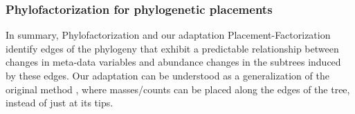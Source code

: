 
\subsubsection*{Phylofactorization for phylogenetic placements}
\label{sec:Factorization:sub:PhyloFactorization:sub:PhylofactorPlacements}

In summary, Phylofactorization and our adaptation Placement-Factorization
identify edges of the phylogeny that exhibit a predictable relationship between changes in meta-data variables and
abundance changes in the subtrees induced by these edges.
Our adaptation can be understood as a generalization of the original method \cite{Washburne2017a,Washburne2019},
where masses/counts can be placed along the edges of the tree, instead of just at its tips.

